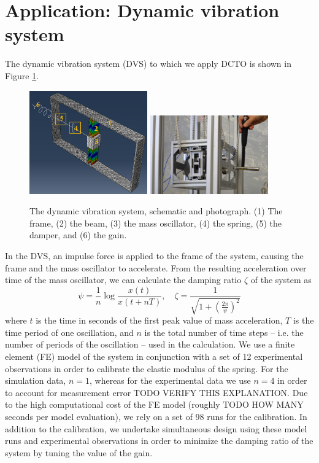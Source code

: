 \documentclass[twocolumn,10pt]{asme2ej}
\begin{document}
%
\section{Application: Dynamic vibration system}\label{sec:dvs}
%
The dynamic vibration system (DVS) to which we apply DCTO is shown in Figure \ref{fig:dvs}.
%
\begin{figure}
	\centering
	\includegraphics[width=2in]{FIG_dvs_illustration}
	\includegraphics[width=2in]{DSC_5206_crop}
	\captionsetup{width=.85\linewidth}
	\caption{The dynamic vibration system, schematic and photograph. (1) The frame, (2) the beam, (3) the mass oscillator, (4) the spring, (5) the damper, and (6) the gain.}
	\label{fig:dvs}
\end{figure}
%
In the DVS, an impulse force is applied to the frame of the system, causing the frame and the mass oscillator to accelerate.
%
From the resulting acceleration over time of the mass oscillator, we can calculate the damping ratio $\zeta$ of the system as
\[
\psi = \frac1n \log\frac{x(t)}{x(t+nT)},\quad \zeta = \frac1{\sqrt{1+\left(\frac{2\pi}{\psi}\right)^2}}
\]
%
where $t$ is the time in seconds of the first peak value of mass acceleration, $T$ is the time period of one oscillation, and $n$ is the total number of time steps -- i.e. the number of periods of the oscillation -- used in the calculation.
%
We use a finite element (FE) model of the system in conjunction with a set of 12 experimental observations in order to calibrate the elastic modulus of the spring.
%
For the simulation data, $n=1$, whereas for the experimental data we use $n=4$ in order to account for measurement error TODO VERIFY THIS EXPLANATION.
%
Due to the high computational cost of the FE model (roughly TODO HOW MANY seconds per model evaluation), we rely on a set of 98 runs for the calibration.
%
In addition to the calibration, we undertake simultaneous design using these model runs and experimental observations in order to minimize the damping ratio of the system by tuning the value of the gain.
%
\end{document}
